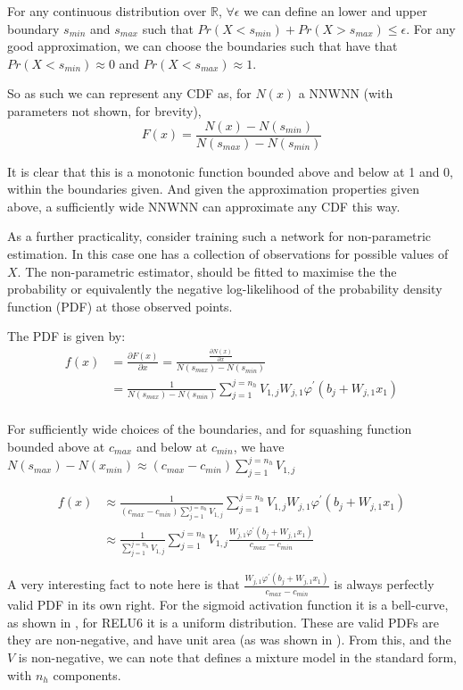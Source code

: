 \documentclass{article} %
\newcommand{\R}{\mathbb{R}}
\begin{document}
For any continuous distribution over $\R$, $\forall \epsilon$ we can define an lower and upper boundary $s_{min}$ and $s_{max}$ such that $Pr(X<s_{min})+Pr(X>s_{max}) \le \epsilon$.
For any good approximation, we can choose the boundaries such that have that $Pr(X<s_{min}) \approx 0$ and $Pr(X<s_{max}) \approx 1$.

So as such we can represent any CDF as,
for $N(x)$ a NNWNN (with parameters not shown, for brevity),
\begin{equation}
	F(x) = \frac{N(x) - N(s_{min})}{N(s_{max})-N(s_{min})}
\end{equation}

It is clear that this is a monotonic function bounded above and below at 1 and 0,
within the boundaries given.
And given the approximation properties given above,
a sufficiently wide NNWNN can approximate any CDF this way.

As a further practicality,
consider training such a network for non-parametric estimation.
In this case one has a collection of observations for possible values of $X$.
The non-parametric estimator, should be fitted to maximise the the probability or equivalently the negative log-likelihood of the probability density function (PDF) at those observed points.

The PDF is given by:
\begin{align}
f(x) &= \frac{\partial F(x)}{\partial x} =\frac{\frac{\partial N(x)}{\partial x}}{N(s_{max})-N(s_{min})} \\
%
&=\frac{1}{N(s_{max})-N(s_{min})} 
\sum_{j=1}^{j=n_h} V_{1,j}W_{j,1} \varphi^\prime (b_j+W_{j,1}x_1) \\
\end{align}

For sufficiently wide choices of the boundaries,
and for squashing function bounded above at $c_{max}$ and below at $c_{min}$,
we have $N(s_{max})-N(x_{min}) \approx (c_{max}-c_{min})\sum_{j=1}^{j=n_h} V_{1,j}$

\begin{align} \label{equ:pdf2}
f(x) &\approx \frac{1}{(c_{max}-c_{min})\sum_{j=1}^{j=n_h} V_{1,j}}  \sum_{j=1}^{j=n_h} V_{1,j}W_{j,1} \varphi^\prime (b_j+W_{j,1}x_1)\\
%
&\approx \frac{1}{\sum_{j=1}^{j=n_h} V_{1,j}}  \sum_{j=1}^{j=n_h} V_{1,j} \frac{W_{j,1} \varphi^\prime (b_j+W_{j,1}x_1)}{c_{max}-c_{min}}
\end{align}

A very interesting fact to note here is that $\frac{W_{j,1} \varphi^\prime (b_j+W_{j,1}x_1)}{c_{max}-c_{min}}$ is always perfectly valid PDF in its own right.
For the sigmoid activation function it is a bell-curve, as shown in , for RELU6 it is a uniform distribution.
These are valid PDFs are they are non-negative, and have unit area (as was shown in ).
From this, and the $V$ is non-negative, we can note that  defines a mixture model in the standard form, with $n_h$ components.
\end{document}

